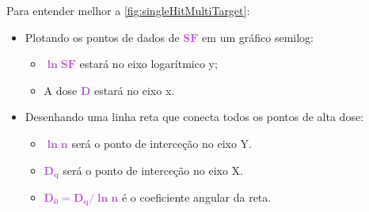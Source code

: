 \documentclass[11pt,a4paper]{article}
\begin{document}
	\begin{tcolorbox}[width=\textwidth, colback={white}, colbacktitle={DarkTurquoise!50!white}, title={$\bigstar$ \LobsterTwo{Para entender melhor: Gráfico do Modelo de Múltiplos Alvos, Hit Único } $\bigstar $}, coltitle={CarnationPink}, colframe={DarkTurquoise}, fonttitle=\rmfamily\bfseries\Large]

		Para entender melhor a \ref{fig:singleHitMultiTarget}:
		
		\begin{itemize}
			\item Plotando os pontos de dados de \textcolor{MediumOrchid}{$\mathbf{SF}$} em um gráfico semilog:
			\begin{itemize}[label=\textcolor{CarnationPink}{$\star$}]
				\item \textcolor{MediumOrchid}{$\mathbf{\ln SF}$} estará no eixo logarítmico y;
				\item A dose \textcolor{MediumOrchid}{$\mathbf{D}$} estará no eixo x.
			\end{itemize}
			
			\item Desenhando uma linha reta que conecta todos os pontos de alta dose:
			\begin{itemize}[label=\textcolor{CarnationPink}{$\star$}]
				\item \textcolor{MediumOrchid}{$\mathbf{\ln n}$} será o ponto de interceção no eixo Y.
				\item \textcolor{MediumOrchid}{$\mathbf{D_q}$} será o ponto de interceção no eixo X.
				\item \textcolor{MediumOrchid}{$\mathbf{D_0 = D_q / \ln n}$} é o coeficiente angular da reta. 
			\end{itemize}
		\end{itemize}
	\end{tcolorbox}
	
	
\end{document}
